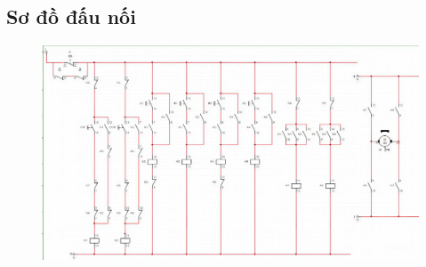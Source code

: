 \subsection{Sơ đồ đấu nối}
\begin{figure}[H]
    \centering
    \includegraphics[width=1\textwidth]{pictures/connection.jpg}
\end{figure}
\cleardoublepage